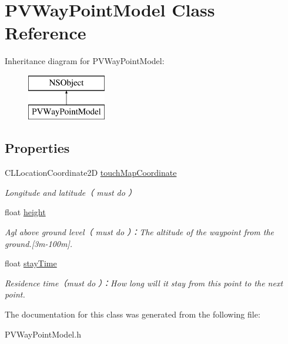 \hypertarget{interface_p_v_way_point_model}{}\section{P\+V\+Way\+Point\+Model Class Reference}
\label{interface_p_v_way_point_model}
Inheritance diagram for P\+V\+Way\+Point\+Model\+:\begin{figure}[H]
\begin{center}
\leavevmode
\includegraphics[height=2.000000cm]{interface_p_v_way_point_model}
\end{center}
\end{figure}
\subsection*{Properties}
\begin{DoxyCompactItemize}
\item 
\mbox{\label{interface_p_v_way_point_model_a8c7fc8aff19801a02a06dfc0865f0b3f}} 
C\+L\+Location\+Coordinate2D \hyperlink{interface_p_v_way_point_model_a8c7fc8aff19801a02a06dfc0865f0b3f}{touch\+Map\+Coordinate}
\begin{DoxyCompactList}\small\item\em Longitude and latitude（ must do ） \end{DoxyCompactList}\item 
\mbox{\label{interface_p_v_way_point_model_a9eb6e8b0e25e390bf732de970ba76d90}} 
float \hyperlink{interface_p_v_way_point_model_a9eb6e8b0e25e390bf732de970ba76d90}{height}
\begin{DoxyCompactList}\small\item\em Agl above ground level（ must do ）：\+The altitude of the waypoint from the ground.\mbox{[}3m-\/100m\mbox{]}. \end{DoxyCompactList}\item 
\mbox{\label{interface_p_v_way_point_model_a31baee095ba2a1fecb35a68b27f1a7d0}} 
float \hyperlink{interface_p_v_way_point_model_a31baee095ba2a1fecb35a68b27f1a7d0}{stay\+Time}
\begin{DoxyCompactList}\small\item\em Residence time（must do ）：\+How long will it stay from this point to the next point. \end{DoxyCompactList}\end{DoxyCompactItemize}


The documentation for this class was generated from the following file\+:\begin{DoxyCompactItemize}
\item 
P\+V\+Way\+Point\+Model.\+h\end{DoxyCompactItemize}
